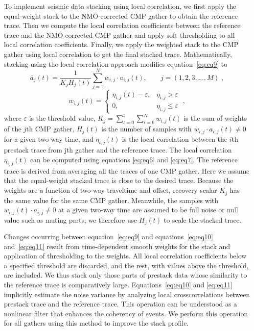 To implement seismic data stacking using local correlation, we
first apply the equal-weight stack to the NMO-corrected CMP gather
to obtain the reference trace. Then we compute the local correlation
coefficients between the reference trace and the NMO-corrected
CMP gather and apply soft thresholding \cite[]{Donoho95} to all local
correlation coefficients. Finally, we apply the weighted stack to the
CMP gather using local correlation to get the final stacked trace.
Mathematically, stacking using the local correlation approach
modifies equation~\ref{eq:eq9} to
      \begin{equation}
          \bar{a}_j(t) = \frac{1}{K_j H_j(t)}\displaystyle\sum_{j=1}^{N} w_{i,j} \cdot a_{i,j}(t), \qquad j=(1,2,3,\dots,M) \;,
        \label{eq:eq10}
      \end{equation}
      \begin{equation}
          w_{i,j}(t) = \left \{ \begin{array}{ll}
                    \eta_{i,j}(t)-\varepsilon, & \eta_{i,j}> \varepsilon\\
		    0, & \eta_{i,j}\le \varepsilon
                  \end{array} \right.\;,
        \label{eq:eq11}
      \end{equation}
where $\varepsilon$ is the threshold value, 
$K_j = \displaystyle\sum_{t=0}^{t}\sum_{i=0}^{N}w_{i,j}(t)$
is the sum of weights of the $j$th CMP gather, $H_j(t)$ is the number of 
samples with $w_{i,j}\cdot a_{i,j}(t)\ne0$ for a given two-way time, and 
$\eta_{i,j}(t)$ is the local correlation
between the $i$th prestack trace from jth gather and the reference
trace. The local correlation $\eta_{i,j}(t)$ can be computed using equations
\ref{eq:eq6} and \ref{eq:eq7}. The reference trace is derived from averaging 
all the traces of one CMP gather. Here we assume that the equal-weight
stacked trace is close to the desired trace. Because the weights are a 
function of two-way traveltime and offset, recovery scalar $K_j$ has the same 
value for the same CMP gather. Meanwhile, the samples with 
$w_{i,j}(t)\cdot a_{i,j}\ne0$ at a given two-way time are assumed to be full 
noise or null value such as muting parts; we therefore use $H_j(t)$ to
scale the stacked trace.

Changes occurring between equation~\ref{eq:eq9} and equations~\ref{eq:eq10} 
and~\ref{eq:eq11} result from time-dependent smooth weights for the stack and 
application of thresholding to the weights. All local correlation coefficients 
below a specified threshold are discarded, and the rest, with values above the 
threshold, are included. We thus stack only those parts of prestack data whose 
similarity to the reference trace is comparatively large. 
Equations~\ref{eq:eq10} and \ref{eq:eq11} implicitly estimate the noise 
variance by analyzing local crosscorrelations between prestack trace and the 
reference trace. This operation can be understood as a nonlinear filter that 
enhances the coherency of events. We perform this operation for all gathers 
using this method to improve the stack profile.

